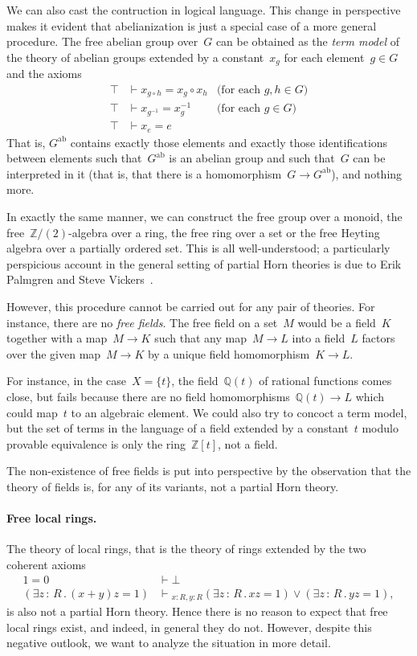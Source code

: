 \documentclass{ws-rv9x6}
\newcommand{\QQ}{\mathbb{Q}}
\newcommand{\ZZ}{\mathbb{Z}}
\newcommand{\ab}{\mathrm{ab}}
\renewcommand{\_}{\mathpunct{.}}
\newcommand{\?}{\,{:}\,}
\newcommand{\seq}[1]{\mathrel{\vdash\!\!\!_{#1}}}
\begin{document}
We can also cast the contruction in logical language. This change in perspective makes it evident
that abelianization is just a special case of a more general procedure.
The free abelian group over~$G$ can be obtained as the \emph{term model} of the
theory of abelian groups extended by a constant~$x_g$ for each element~$g \in
G$ and the axioms
\begin{align*}
  \top &\vdash x_{g \circ h} = x_g \circ x_h & \text{(for each~$g,h \in G$)} \\
  \top &\vdash x_{g^{-1}} = x_g^{-1} & \text{(for each~$g \in G$)} \\
  \top &\vdash x_e = e
\end{align*}
That is, $G^\ab$ contains exactly those elements and exactly those
identifications between elements such that~$G^\ab$ is an abelian group and such
that~$G$ can be interpreted in it (that is, that there is a homomorphism~$G \to
G^\ab$), and nothing more.

In exactly the same manner, we can construct the free group over a monoid, the
free~$\ZZ/(2)$-algebra over a ring, the free ring over a set or the free
Heyting algebra over a partially ordered set. This is all well-understood; a
particularly perspicious account in the general setting of partial Horn
theories is due to Erik Palmgren and Steve Vickers~\cite[Section~5]{palmgren-vickers:partial-horn}.

However, this procedure cannot be carried out for any pair of theories. For
instance, there are no \emph{free fields}. The free field on a set~$M$ would be
a field~$K$ together with a map~$M \to K$ such that any map~$M \to L$ into a field~$L$ factors
over the given map~$M \to K$ by a unique field homomorphism~$K \to L$.

For instance, in the case~$X = \{ t \}$, the field~$\QQ(t)$ of rational
functions comes close, but fails because there are no field homomorphisms~$\QQ(t)
\to L$ which could map~$t$ to an algebraic element. We could also try to
concoct a term model, but the set of terms in the language of a field extended
by a constant~$t$ modulo provable equivalence is only the ring~$\ZZ[t]$, not a
field.

The non-existence of free fields is put into perspective by the observation that the
theory of fields is, for any of its variants, not a partial Horn theory.

\paragraph{Free local rings.} The theory of local rings, that is the theory of
rings extended by the two coherent axioms
\begin{align*}
  1 = 0 &\vdash \bot \\
  (\exists z\?R\_ (x+y)z = 1) &\seq{x:R,y:R} (\exists z\?R\_ xz = 1) \vee
  (\exists z\?R\_ yz = 1),
\end{align*}
is also not a partial Horn theory. Hence there is no reason to expect that free
local rings exist, and indeed, in general they do not. However, despite this
negative outlook, we want to analyze the situation in more detail.
\end{document}
